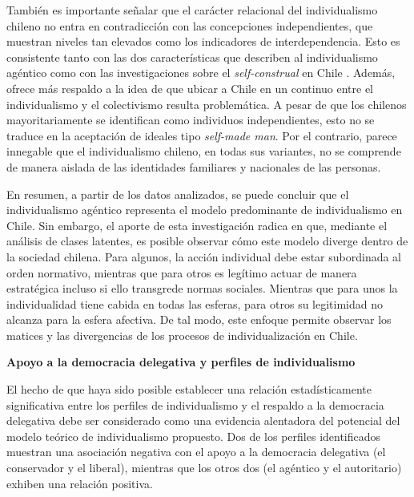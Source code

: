 \documentclass[12pt,twoside]{templates/facsothesis}
\begin{document}
También es importante señalar que el carácter relacional del individualismo chileno no entra en contradicción con las concepciones independientes, que muestran niveles tan elevados como los indicadores de interdependencia. Esto es consistente tanto con las dos características que describen al individualismo agéntico \citep{araujo2020} como con las investigaciones sobre el \emph{self-construal} en Chile \citep{benavides2020, kolstad2009}. Además, ofrece más respaldo a la idea de que ubicar a Chile en un continuo entre el individualismo y el colectivismo resulta problemática. A pesar de que los chilenos mayoritariamente se identifican como individuos independientes, esto no se traduce en la aceptación de ideales tipo \emph{self-made man}. Por el contrario, parece innegable que el individualismo chileno, en todas sus variantes, no se comprende de manera aislada de las identidades familiares y nacionales de las personas.

En resumen, a partir de los datos analizados, se puede concluir que el individualismo agéntico representa el modelo predominante de individualismo en Chile. Sin embargo, el aporte de esta investigación radica en que, mediante el análisis de clases latentes, es posible observar cómo este modelo diverge dentro de la sociedad chilena. Para algunos, la acción individual debe estar subordinada al orden normativo, mientras que para otros es legítimo actuar de manera estratégica incluso si ello transgrede normas sociales. Mientras que para unos la individualidad tiene cabida en todas las esferas, para otros su legitimidad no alcanza para la esfera afectiva. De tal modo, este enfoque permite observar los matices y las divergencias de los procesos de individualización en Chile.

\textbf{Apoyo a la democracia delegativa y perfiles de individualismo}

El hecho de que haya sido posible establecer una relación estadísticamente significativa entre los perfiles de individualismo y el respaldo a la democracia delegativa debe ser considerado como una evidencia alentadora del potencial del modelo teórico de individualismo propuesto. Dos de los perfiles identificados muestran una asociación negativa con el apoyo a la democracia delegativa (el conservador y el liberal), mientras que los otros dos (el agéntico y el autoritario) exhiben una relación positiva.
\end{document}
